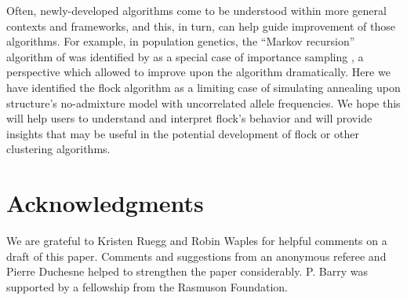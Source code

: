  
Often, newly-developed algorithms come to be understood within more general contexts and 
frameworks, and this, in turn, can help guide improvement of those algorithms.  For example, in population
genetics, the ``Markov recursion'' algorithm of \citet{Gri&Tav1994-AI} was identified by \citet{Felsensteinetal1999} 
as a special case of importance sampling \citep{Ham&Han1964}, a perspective which allowed 
\citet{Ste&Don2000} to improve upon the algorithm dramatically.  Here we have identified the {\sc flock}
algorithm as a limiting case of simulating annealing upon {\sc structure}'s no-admixture model with uncorrelated
allele frequencies. We hope this will
help users to understand and interpret {\sc flock}'s behavior and will provide insights that may be useful 
in the potential development of {\sc flock} or other clustering algorithms.   


\section*{Acknowledgments}
We are grateful to Kristen Ruegg and Robin Waples for helpful comments on a draft of this paper.
Comments and suggestions from an anonymous referee and Pierre Duchesne helped to strengthen the
paper considerably.
P. Barry was supported by a fellowship from the Rasmuson Foundation.